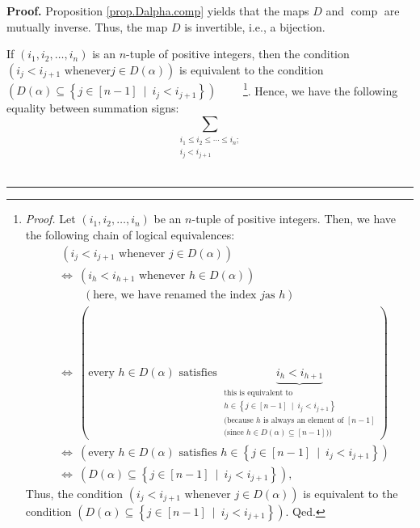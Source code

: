 \documentclass[numbers=enddot,12pt,final,onecolumn,notitlepage,abstracton]{scrartcl}
\theoremstyle{definition}
\newenvironment{proof}[1][Proof]{\noindent\textbf{#1.} }{\ \rule{0.5em}{0.5em}}
\let\sumnonlimits\sum
\renewcommand{\sum}{\sumnonlimits\limits}
\newenvironment{verlong}{}{}
\begin{document}
\begin{verlong}
\begin{footnotesize}
\begin{proof}
Proposition \ref{prop.Dalpha.comp} yields that the maps $D$ and
$\operatorname*{comp}$ are mutually inverse. Thus, the map $D$ is invertible,
i.e., a bijection.

If $\left(  i_{1},i_{2},\ldots,i_{n}\right)  $ is an $n$-tuple of positive
integers, then the condition \newline$\left(  i_{j}<i_{j+1}\text{ whenever
}j\in D\left(  \alpha\right)  \right)  $ is equivalent to the condition
\newline$\left(  D\left(  \alpha\right)  \subseteq\left\{  j\in\left[
n-1\right]  \ \mid\ i_{j}<i_{j+1}\right\}  \right)  $%
\ \ \ \ \footnote{\textit{Proof.} Let $\left(  i_{1},i_{2},\ldots
,i_{n}\right)  $ be an $n$-tuple of positive integers. Then, we have the
following chain of logical equivalences:%
\begin{align*}
&  \ \left(  i_{j}<i_{j+1}\text{ whenever }j\in D\left(  \alpha\right)
\right) \\
&  \Longleftrightarrow\ \left(  i_{h}<i_{h+1}\text{ whenever }h\in D\left(
\alpha\right)  \right) \\
&  \ \ \ \ \ \ \ \ \ \ \left(  \text{here, we have renamed the index }j\text{
as }h\right) \\
&  \Longleftrightarrow\ \left(  \text{every }h\in D\left(  \alpha\right)
\text{ satisfies }\underbrace{i_{h}<i_{h+1}}_{\substack{\text{this is
equivalent to}\\h\in\left\{  j\in\left[  n-1\right]  \ \mid\ i_{j}%
<i_{j+1}\right\}  \\\text{(because }h\text{ is always an element of }\left[
n-1\right]  \\\text{(since }h\in D\left(  \alpha\right)  \subseteq\left[
n-1\right]  \text{))}}}\right) \\
&  \Longleftrightarrow\ \left(  \text{every }h\in D\left(  \alpha\right)
\text{ satisfies }h\in\left\{  j\in\left[  n-1\right]  \ \mid\ i_{j}%
<i_{j+1}\right\}  \right) \\
&  \Longleftrightarrow\ \left(  D\left(  \alpha\right)  \subseteq\left\{
j\in\left[  n-1\right]  \ \mid\ i_{j}<i_{j+1}\right\}  \right)  ,
\end{align*}
Thus, the condition $\left(  i_{j}<i_{j+1}\text{ whenever }j\in D\left(
\alpha\right)  \right)  $ is equivalent to the condition $\left(  D\left(
\alpha\right)  \subseteq\left\{  j\in\left[  n-1\right]  \ \mid\ i_{j}%
<i_{j+1}\right\}  \right)  $. Qed.}. Hence, we have the following equality
between summation signs:%
\[
\sum_{\substack{i_{1}\leq i_{2}\leq\cdots\leq i_{n};\\i_{j}<i_{j+1}\text{
}}}\]
\end{proof}
\end{footnotesize}
\end{verlong}
\end{document}
